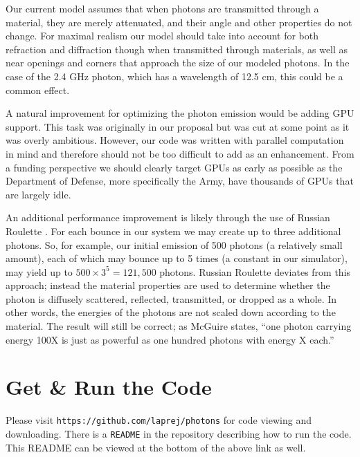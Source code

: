 \documentclass[%
        final,
        notitlepage,
        narroweqnarray,
        inline,
        twoside,
        ]{ieee}
\begin{document}
Our current model assumes that when photons are transmitted through a material,
they are merely attenuated, and their angle and other properties do not change.
For maximal realism our model should take into account for both refraction and
diffraction though when transmitted through materials, as well as near openings and
corners that approach the size of our modeled photons. In the case of the 2.4 GHz photon,
which has a wavelength of 12.5 cm, this could be a common effect.

A natural improvement for optimizing the photon emission would be adding
GPU support.  This task was originally in our proposal but was cut at some
point as it was overly ambitious.  However, our code was written with
parallel computation in mind and therefore should not be too difficult to
add as an enhancement.  From a funding perspective we should clearly target
GPUs as early as possible as the Department of Defense, more specifically the
Army, have thousands of GPUs that are largely idle.

An additional performance improvement is likely through the use of
Russian Roulette \cite{Jensen96globalillumination}\cite{Russian}.  For each
bounce in our
system we may create up to three additional photons.  So, for example, our
initial emission of 500 photons (a relatively small amount), each of which may
bounce up to 5 times (a constant in our simulator), may yield up
to $500 \times 3^5 = 121,500$ photons.  Russian Roulette deviates from this
approach; instead the material properties are used to determine whether the
photon is diffusely scattered, reflected, transmitted, or dropped as a whole.
In other words, the energies of the photons are not scaled down according to
the material.  The result will still be correct; as McGuire states,
``one photon carrying energy 100X is just as powerful as one hundred photons
with energy X each.''\cite{Russian}

\section{Get \& Run the Code}
Please visit \texttt{https://github.com/laprej/photons} for code viewing
and downloading.  There is a \texttt{README} in the repository describing how
to run the code.  This README can be viewed at the bottom of the above link
as well.



\newpage
\end{document}
